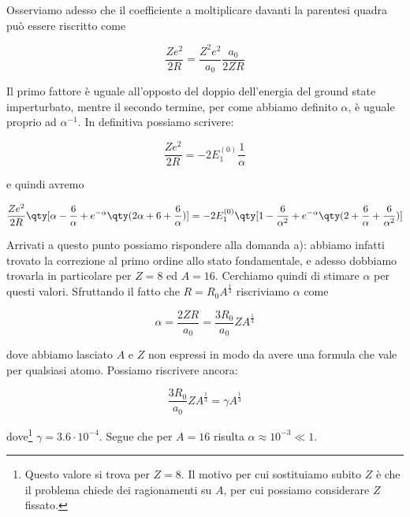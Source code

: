 \begin{soluzione}
   Osserviamo adesso che il coefficiente a moltiplicare davanti la parentesi quadra può essere riscritto come

   \begin{equation*}
      \frac{Z e^2}{2R}
      =\frac{Z^2 e^2}{a_0} \frac{a_0}{2ZR}
   \end{equation*}

   Il primo fattore è uguale all'opposto del doppio dell'energia del ground state imperturbato, mentre il secondo termine, per come abbiamo definito $\alpha$, è uguale proprio ad $\alpha^{-1}$. In definitiva possiamo scrivere:

   \begin{equation*}
      \frac{Z e^2}{2R}
      =-2E_1^{(0)} \frac{1}{\alpha}
   \end{equation*}

   e quindi avremo

   \begin{equation}
      \frac{Z e^2}{2R} \qty[ \alpha - \frac{6}{\alpha} + e^{-\alpha}\qty( 2\alpha + 6 + \frac{6}{\alpha} ) ]
      =-2E_1^{(0)} \qty[ 1 - \frac{6}{\alpha^2} + e^{-\alpha}\qty( 2 + \frac{6}{\alpha} + \frac{6}{\alpha^2} ) ]
      \label{eq:risultato_integrale_per_parti_con_sostituzione_hint}
   \end{equation}

   Arrivati a questo punto possiamo rispondere alla domanda a): abbiamo infatti trovato la correzione al primo ordine allo stato fondamentale, e adesso dobbiamo trovarla in particolare per $Z=8$ ed $A=16$. Cerchiamo quindi di stimare $\alpha$ per questi valori. Sfruttando il fatto che $R=R_0A^{\frac{1}{3}}$ riscriviamo $\alpha$ come

   \begin{equation*}
      \alpha
      =\frac{2ZR}{a_0}
      =\frac{3R_0}{a_0} Z A^{\frac{1}{3}}
   \end{equation*}

   dove abbiamo lasciato $A$ e $Z$ non espressi in modo da avere una formula che vale per qualsiasi atomo. Possiamo riscrivere ancora:
   
   \begin{equation*}
      \frac{3R_0}{a_0} Z A^{\frac{1}{3}}
      =\gamma A^{\frac{1}{3}}
   \end{equation*}

   dove\footnote{Questo valore si trova per $Z=8$. Il motivo per cui sostituiamo subito $Z$ è che il problema chiede dei ragionamenti su $A$, per cui possiamo considerare $Z$ fissato.} $\gamma=3.6 \cdot 10^{-4}$. Segue che per $A=16$ risulta $\alpha \approx 10^{-3} \ll 1$.
   

\end{soluzione}
